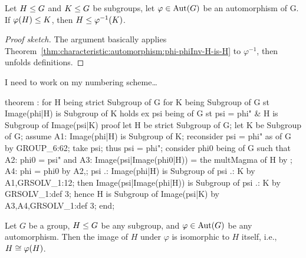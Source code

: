 \begin{theorem}
Let $H\leq G$ and $K\leq G$ be subgroups, let $\varphi\in\operatorname{Aut}(G)$
be an automorphism of G. If $\varphi(H)\leq K$, then $H\leq\varphi^{-1}(K)$.
\end{theorem}


\begin{proof}[Proof sketch]
The argument basically applies Theorem~\ref{thm:characteristic:automorphism:phi-phiInv-H-is-H} to $\varphi^{-1}$, then unfolds
definitions.
\end{proof}

\begin{thm-remark}
I need to work on my numbering scheme\dots
\end{thm-remark}

\nwenddocs{}\endmoddef\nwstartdeflinemarkup{}\nwenddeflinemarkup
theorem :
  for H being strict Subgroup of G
  for K being Subgroup of G
  st Image(phi|H) is Subgroup of K
  holds ex psi being  of G
  st psi = phi" & H is Subgroup of Image(psi|K)
proof
  let H be strict Subgroup of G;
  let K be Subgroup of G;
  assume A1: Image(phi|H) is Subgroup of K;
  reconsider psi = phi" as  of G by GROUP_6:62;
  take psi;
  thus psi = phi";
  consider phi0 being  of G such that
  A2: phi0 = psi" and
  A3: Image(psi|Image(phi0|H)) = the multMagma of H
  by ;
  A4: phi = phi0 by A2,;
  psi .: Image(phi|H) is Subgroup of psi .: K by A1,GRSOLV_1:12;
  then Image(psi|Image(phi|H)) is Subgroup of psi .: K by GRSOLV_1:def 3;
  hence H is Subgroup of Image(psi|K) by A3,A4,GRSOLV_1:def 3;
end;
\eatline
{}\nwendcode{}\nwdocspar
\begin{theorem}
Let $G$ be a group, $H\leq G$ be any subgroup, and
$\varphi\in\operatorname{Aut}(G)$ be any automorphism. Then the image of $H$ under
$\varphi$ is isomorphic to $H$ itself, i.e., $H\cong\varphi(H)$.
\end{theorem}

